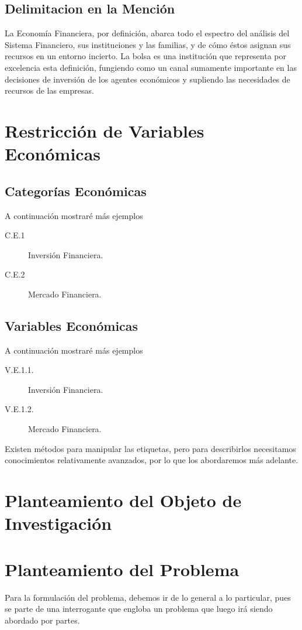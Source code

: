 \subsection{Delimitacion en la Mención}
La Economía Financiera, por definición, abarca todo el espectro del análisis del Sistema Financiero, sus instituciones y las familias, y de cómo éstos asignan sus recursos en un entorno incierto. La bolsa es una institución que representa por excelencia esta definición, fungiendo como un canal sumamente importante en las decisiones de inversión de los agentes económicos y supliendo las necesidades de recursos de las empresas.
\section{Restricción de Variables Económicas}
\subsection{Categorías Económicas}
A continuación mostraré más ejemplos  
\begin{description}
    \item[C.E.1] Inversión Financiera.
    \item[C.E.2] Mercado Financiera. 
\end{description}
\subsection{Variables Económicas}
A continuación mostraré más ejemplos
\begin{description}
    \item[V.E.1.1.] Inversión Financiera.
    \item[V.E.1.2.] Mercado Financiera.
\end{description}
Existen métodos para manipular las etiquetas, pero para describirlos necesitamos conocimientos relativamente avanzados, por lo que los abordaremos más adelante. 

\section{Planteamiento del Objeto de Investigación}
\section{Planteamiento del Problema}
Para la formulación del problema, debemos ir de lo general a lo particular, pues se parte de una interrogante que engloba un problema que luego irá siendo abordado por partes.

